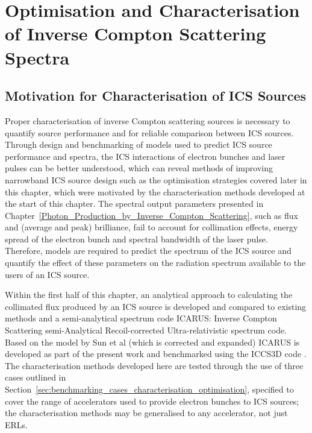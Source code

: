 \documentclass[../main.tex]{subfiles}
\begin{document}
\chapter{Optimisation and Characterisation of Inverse Compton Scattering Spectra}
\label{Optimisation_and_Characterisation_of_Inverse_Compton Scattering_Spectra} %

\section{Motivation for Characterisation of ICS Sources}

Proper characterisation of inverse Compton scattering sources is necessary to quantify source performance and for reliable comparison between ICS sources. Through design and benchmarking of models used to predict ICS source performance and spectra, the ICS interactions of electron bunches and laser pulses can be better understood, which can reveal methods of improving narrowband ICS source design such as the optimisation strategies covered later in this chapter, which were motivated by the characterisation methods developed at the start of this chapter. The spectral output parameters presented in Chapter~\ref{Photon_Production_by_Inverse_Compton_Scattering}, such as flux and (average and peak) brilliance, fail to account for collimation effects, energy spread of the electron bunch and spectral bandwidth of the laser pulse. Therefore, models are required to predict the spectrum of the ICS source and quantify the effect of these parameters on the radiation spectrum available to the users of an ICS source. 

Within the first half of this chapter, an analytical approach to calculating the collimated flux produced by an ICS source is developed and compared to existing methods \cite{curatolo2017analytical} and a semi-analytical spectrum code \textsc{ICARUS}: Inverse Compton Scattering semi-Analytical Recoil-corrected Ultra-relativistic spectrum code. Based on the model by Sun et al \cite{sun2009characterizations,sun2011theoretical} (which is corrected and expanded) \textsc{ICARUS} is developed as part of the present work and benchmarked using the \textsc{ICCS3D} code \cite{krafft2016laser,ranjan2018simulation}. The characterisation methods developed here are tested through the use of three cases outlined in Section~\ref{sec:benchmarking_cases_characterisation_optimisation}, specified to cover the range of accelerators used to provide electron bunches to ICS sources; the characterisation methods may be generalised to any accelerator, not just ERLs.
\end{document}

